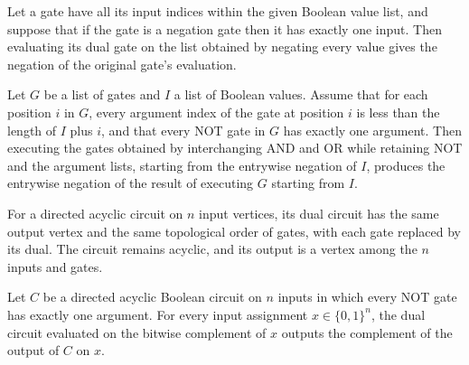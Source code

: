 \begin{theorem}
\label{BoolCircuit.DAGGate.eval_dual}
\leanok
{}
Let a gate have all its input indices within the given Boolean value list, and suppose
that if the gate is a negation gate then it has exactly one input. Then evaluating its
dual gate on the list obtained by negating every value gives the negation of the
original gate's evaluation.
\end{theorem}

\begin{theorem}
\label{BoolCircuit.runWith_dual}
\leanok
{}
Let $G$ be a list of gates and $I$ a list of Boolean values. Assume that for each
position $i$ in $G$, every argument index of the gate at position $i$ is less than the
length of $I$ plus $i$, and that every NOT gate in $G$ has exactly one argument. Then
executing the gates obtained by interchanging AND and OR while retaining NOT and the
argument lists, starting from the entrywise negation of $I$, produces the entrywise
negation of the result of executing $G$ starting from $I$.
\end{theorem}

\begin{definition}
\label{BoolCircuit.DAGCircuit.dual}
\leanok
{}
For a directed acyclic circuit on $n$ input vertices, its dual circuit has the same
output vertex and the same topological order of gates, with each gate replaced by its
dual. The circuit remains acyclic, and its output is a vertex among the $n$ inputs and
gates.
\end{definition}

\begin{theorem}
\label{BoolCircuit.DAGCircuit.eval_dual}
\leanok
{}
Let $C$ be a directed acyclic Boolean circuit on $n$ inputs in which every NOT gate has
exactly one argument. For every input assignment $x\in\{0,1\}^n$, the dual circuit
evaluated on the bitwise complement of $x$ outputs the complement of the output of $C$
on $x$.
\end{theorem}

